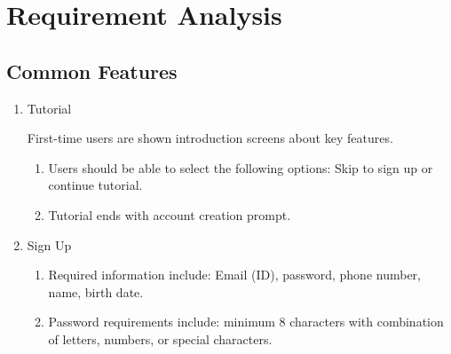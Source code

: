 \documentclass[conference]{IEEEtran}
\begin{document}
\vspace{1em} %

\section{Requirement Analysis}

\vspace{1em} %

\subsection{Common Features}
\vspace{0.5em}

\begin{enumerate}[label=\arabic*]
    \item Tutorial\par
    \vspace{0.3em}
    First-time users are shown introduction screens about key features.
    \vspace{0.3em}

    \begin{enumerate}[label=\arabic*)]
        \item Users should be able to select the following options: Skip to sign up or continue tutorial.

        \vspace{0.5em}

        \item Tutorial ends with account creation prompt.
    \end{enumerate}

    \vspace{1em}

    \item Sign Up\par
    \vspace{0.3em}

    \begin{enumerate}[label=\arabic*)]
        \item Required information include: Email (ID), password, phone number, name, birth date.

        \vspace{0.5em}

        \item Password requirements include: minimum 8 characters with combination of letters, numbers, or special characters.


\end{enumerate}
\end{enumerate}
\end{document}
